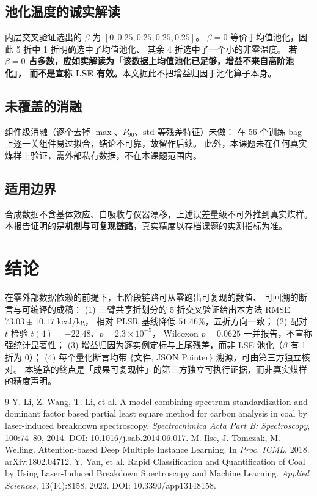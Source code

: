 \documentclass[11pt,a4paper,UTF8]{ctexart}
\begin{document}
\subsection{池化温度的诚实解读}
内层交叉验证选出的 $\beta$ 为 $[0, 0.25, 0.25, 0.25, 0.25]$。
$\beta=0$ 等价于均值池化，因此 5 折中 1 折明确选中了均值池化、
其余 4 折选中了一个小的非零温度。
\textbf{若 $\beta=0$ 占多数，应如实解读为「该数据上均值池化已足够，增益不来自高阶池化」，
而不是宣称 LSE 有效。}本文据此不把增益归因于池化算子本身。

\subsection{未覆盖的消融}
组件级消融（逐个去掉 $\max$、$P_{90}$、$\mathrm{std}$ 等残差特征）未做：
在 56 个训练 bag 上逐一关组件易过拟合，结论不可靠，故留作后续。
此外，本课题未在任何真实煤样上验证，需外部私有数据，不在本课题范围内。

\subsection{适用边界}
合成数据不含基体效应、自吸收与仪器漂移，上述误差量级不可外推到真实煤样。
本报告证明的是\textbf{机制与可复现链路}，真实精度以存档课题的实测指标为准。

\section{结论}
在零外部数据依赖的前提下，七阶段链路可从零跑出可复现的数值、
可回溯的断言与可编译的成稿：
(1) 三臂共享折划分的 5 折交叉验证给出本方法 RMSE $73.03\pm 10.17$ kcal/kg，
相对 PLSR 基线降低 $51.46\%$，五折方向一致；
(2) 配对 $t$ 检验 $t(4)=-22.48$、$p=2.3\times 10^{-5}$，
Wilcoxon $p=0.0625$ 一并报告，不宣称强统计显著性；
(3) 增益归因为逐实例定标与上尾残差，而非 LSE 池化（$\beta$ 有 1 折为 0）；
(4) 每个量化断言均带 $\{$文件, JSON Pointer$\}$ 溯源，可由第三方独立核对。
本链路的终点是「成果可复现性」的第三方独立可执行证据，而非真实煤样的精度声明。

\begin{thebibliography}{9}
 Y. Li, Z. Wang, T. Li, et al. A model combining spectrum standardization and dominant factor based partial least square method for carbon analysis in coal by laser-induced breakdown spectroscopy. \textit{Spectrochimica Acta Part B: Spectroscopy}, 100:74--80, 2014. DOI: 10.1016/j.sab.2014.06.017.
 M. Ilse, J. Tomczak, M. Welling. Attention-based Deep Multiple Instance Learning. In \textit{Proc. ICML}, 2018. arXiv:1802.04712.
 Y. Yan, et al. Rapid Classification and Quantification of Coal by Using Laser-Induced Breakdown Spectroscopy and Machine Learning. \textit{Applied Sciences}, 13(14):8158, 2023. DOI: 10.3390/app13148158.
\end{thebibliography}
\end{document}
